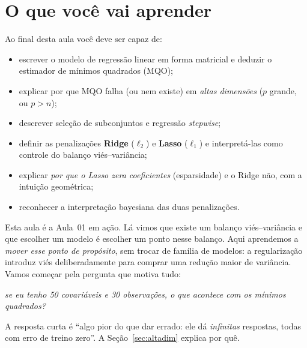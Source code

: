\documentclass[11pt,a4paper]{article}
\title{}
\date{}
\begin{document}

\section*{O que você vai aprender}
Ao final desta aula você deve ser capaz de:
\begin{itemize}[leftmargin=1.4cm]
  \item escrever o modelo de regressão linear em forma matricial e deduzir o
        estimador de mínimos quadrados (MQO);
  \item explicar por que MQO falha (ou nem existe) em \emph{altas dimensões}
        ($p$ grande, ou $p>n$);
  \item descrever seleção de subconjuntos e regressão \emph{stepwise};
  \item definir as penalizações \textbf{Ridge} ($\ell_2$) e \textbf{Lasso}
        ($\ell_1$) e interpretá-las como controle do balanço viés--variância;
  \item explicar \emph{por que o Lasso zera coeficientes} (esparsidade) e o Ridge
        não, com a intuição geométrica;
  \item reconhecer a interpretação bayesiana das duas penalizações.
\end{itemize}

\noindent
Esta aula é a Aula~01 em ação. Lá vimos que existe um balanço viés--variância e que
escolher um modelo é escolher um ponto nesse balanço. Aqui aprendemos a
\emph{mover esse ponto de propósito}, sem trocar de família de modelos: a
regularização introduz viés deliberadamente para comprar uma redução maior de
variância. Vamos começar pela pergunta que motiva tudo:

\begin{center}\itshape
  se eu tenho 50 covariáveis e 30 observações, o que acontece com os mínimos
  quadrados?
\end{center}

\noindent
A resposta curta é ``algo pior do que dar errado: ele dá \emph{infinitas} respostas,
todas com erro de treino zero''. A Seção~\ref{sec:altadim} explica por quê.

\end{document}
